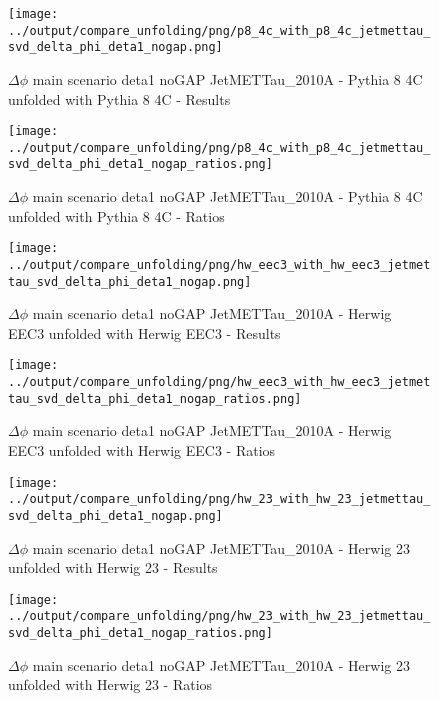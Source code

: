 \documentclass[11pt]{book}
\begin{document}
\begin{figure}[ht]
\centering
\texttt{[image: ../output/compare\_unfolding/png/p8\_4c\_with\_p8\_4c\_jetmettau\_svd\_delta\_phi\_deta1\_nogap.png]}
\caption{$\Delta\phi$ main scenario deta1 noGAP JetMETTau\_2010A - Pythia 8 4C unfolded with Pythia 8 4C - Results}
\label{p8_p8_jetmettau_svd_delta_phi_deta1_nogap_a}
\end{figure}

\begin{figure}[ht]
\centering
\texttt{[image: ../output/compare\_unfolding/png/p8\_4c\_with\_p8\_4c\_jetmettau\_svd\_delta\_phi\_deta1\_nogap\_ratios.png]}
\caption{$\Delta\phi$ main scenario deta1 noGAP JetMETTau\_2010A - Pythia 8 4C unfolded with Pythia 8 4C - Ratios}
\label{p8_p8_jetmettau_svd_delta_phi_deta1_nogap_b}
\end{figure}

\begin{figure}[ht]
\centering
\texttt{[image: ../output/compare\_unfolding/png/hw\_eec3\_with\_hw\_eec3\_jetmettau\_svd\_delta\_phi\_deta1\_nogap.png]}
\caption{$\Delta\phi$ main scenario deta1 noGAP JetMETTau\_2010A - Herwig EEC3 unfolded with Herwig EEC3 - Results}
\label{hw_eec3_hw_eec3_jetmettau_svd_delta_phi_deta1_nogap_a}
\end{figure}

\begin{figure}[ht]
\centering
\texttt{[image: ../output/compare\_unfolding/png/hw\_eec3\_with\_hw\_eec3\_jetmettau\_svd\_delta\_phi\_deta1\_nogap\_ratios.png]}
\caption{$\Delta\phi$ main scenario deta1 noGAP JetMETTau\_2010A - Herwig EEC3 unfolded with Herwig EEC3 - Ratios}
\label{hw_eec3_hw_eec3_jetmettau_svd_delta_phi_deta1_nogap_b}
\end{figure}

\begin{figure}[ht]
\centering
\texttt{[image: ../output/compare\_unfolding/png/hw\_23\_with\_hw\_23\_jetmettau\_svd\_delta\_phi\_deta1\_nogap.png]}
\caption{$\Delta\phi$ main scenario deta1 noGAP JetMETTau\_2010A - Herwig 23 unfolded with Herwig 23 - Results}
\label{hw_23_hw_23_jetmettau_svd_delta_phi_deta1_nogap_a}
\end{figure}

\begin{figure}[ht]
\centering
\texttt{[image: ../output/compare\_unfolding/png/hw\_23\_with\_hw\_23\_jetmettau\_svd\_delta\_phi\_deta1\_nogap\_ratios.png]}
\caption{$\Delta\phi$ main scenario deta1 noGAP JetMETTau\_2010A - Herwig 23 unfolded with Herwig 23 - Ratios}
\label{hw_23_hw_23_jetmettau_svd_delta_phi_deta1_nogap_b}
\end{figure}
\end{document}
